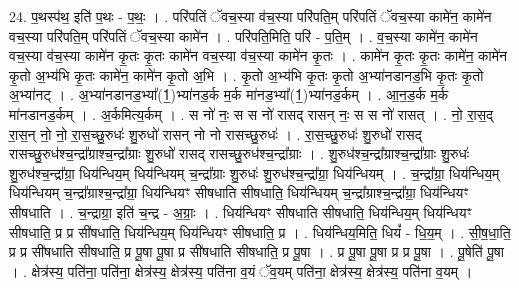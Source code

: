 \documentclass[17pt]{extarticle}
\begin{document}
24. प॒थस्प॑थ॒ इति॑ प॒थः - प॒थः॒ । . परि॑पतिं ॅवच॒स्या व॑च॒स्या परि॑पति॒म् परि॑पतिं ॅवच॒स्या कामे॑न॒ कामे॑न वच॒स्या परि॑पति॒म् परि॑पतिं ॅवच॒स्या कामे॑न । . परि॑पति॒मिति॒ परि॑ - प॒ति॒म् । . व॒च॒स्या कामे॑न॒ कामे॑न वच॒स्या व॑च॒स्या कामे॑न कृ॒तः कृ॒तः कामे॑न वच॒स्या व॑च॒स्या कामे॑न कृ॒तः । . कामे॑न कृ॒तः कृ॒तः कामे॑न॒ कामे॑न कृ॒तो अ॒भ्य॑भि कृ॒तः कामे॑न॒ कामे॑न कृ॒तो अ॒भि । . कृ॒तो अ॒भ्य॑भि कृ॒तः कृ॒तो अ॒भ्या॑नडानड॒भि कृ॒तः कृ॒तो अ॒भ्या॑नट् । . अ॒भ्या॑नडानड॒भ्या᳚(1॒)भ्या॑नड॒र्क म॒र्क मा॑नड॒भ्या᳚(1॒)भ्या॑नड॒र्कम् । . आ॒न॒ड॒र्क म॒र्क मा॑नडानड॒र्कम् । . अ॒र्कमित्य॒र्कम् । . स नो॑ नः॒ स स नो॑ रासद् रासन् नः॒ स स नो॑ रासत् । . नो॒ रा॒स॒द् रा॒स॒न् नो॒ नो॒ रा॒स॒च्छु॒रुधः॑ शु॒रुधो॑ रासन् नो नो रासच्छु॒रुधः॑ । . रा॒स॒च्छु॒रुधः॑ शु॒रुधो॑ रासद् रासच्छु॒रुध॑श्च॒न्द्रा᳚ग्राश्च॒न्द्रा᳚ग्राः शु॒रुधो॑ रासद् रासच्छु॒रुध॑श्च॒न्द्रा᳚ग्राः । . शु॒रुध॑श्च॒न्द्रा᳚ग्राश्च॒न्द्रा᳚ग्राः शु॒रुधः॑ शु॒रुध॑श्च॒न्द्रा᳚ग्रा॒ धिय॑न्धिय॒म् धिय॑न्धियम् च॒न्द्रा᳚ग्राः शु॒रुधः॑ शु॒रुध॑श्च॒न्द्रा᳚ग्रा॒ धिय॑न्धियम् । . च॒न्द्रा᳚ग्रा॒ धिय॑न्धिय॒म् धिय॑न्धियम् च॒न्द्रा᳚ग्राश्च॒न्द्रा᳚ग्रा॒ धिय॑न्धियꣳ सीषधाति सीषधाति॒ धिय॑न्धियम् च॒न्द्रा᳚ग्राश्च॒न्द्रा᳚ग्रा॒ धिय॑न्धियꣳ सीषधाति । . च॒न्द्राग्रा॒ इति॑ च॒न्द्र - अ॒ग्राः॒ । . धिय॑न्धियꣳ सीषधाति सीषधाति॒ धिय॑न्धिय॒म् धिय॑न्धियꣳ सीषधाति॒ प्र प्र सी॑षधाति॒ धिय॑न्धिय॒म् धिय॑न्धियꣳ सीषधाति॒ प्र । . धिय॑न्धिय॒मिति॒ धियं᳚ - धि॒य॒म् । . सी॒ष॒धा॒ति॒ प्र प्र सी॑षधाति सीषधाति॒ प्र पू॒षा पू॒षा प्र सी॑षधाति सीषधाति॒ प्र पू॒षा । . प्र पू॒षा पू॒षा प्र प्र पू॒षा । . पू॒षेति॑ पू॒षा । . क्षेत्र॑स्य॒ पति॑ना॒ पति॑ना॒ क्षेत्र॑स्य॒ क्षेत्र॑स्य॒ पति॑ना व॒यं ॅव॒यम् पति॑ना॒ क्षेत्र॑स्य॒ क्षेत्र॑स्य॒ पति॑ना व॒यम् । \newline
\end{document}
